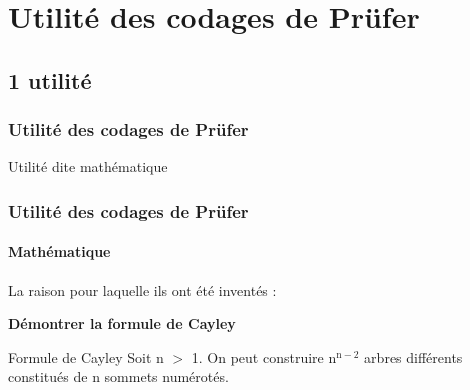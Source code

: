 \documentclass[11pt]{beamer}
\begin{document}
\section{Utilité des codages de Prüfer}

\subsection{1\iere{} utilité}
\begin{frame}
\end{frame}

\begin{frame}
\frametitle{Utilité des codages de Prüfer}

\begin{center}
\LARGE{Utilité dite mathématique}
\end{center}

\end{frame}

\begin{frame}
\frametitle{Utilité des codages de Prüfer}
\framesubtitle{Mathématique}

La raison pour laquelle ils ont été inventés :\\
\vspace{0.3cm}
\begin{center}
\textbf{Démontrer la formule de Cayley}
\end{center}
\pause
\vspace{0.2cm}
\begin{block}{Formule de Cayley}
Soit n $>$ 1. On peut construire n$^{\text{n}-2}$ arbres différents constitués de n sommets numérotés.
\end{block}

\end{frame}
\end{document}
